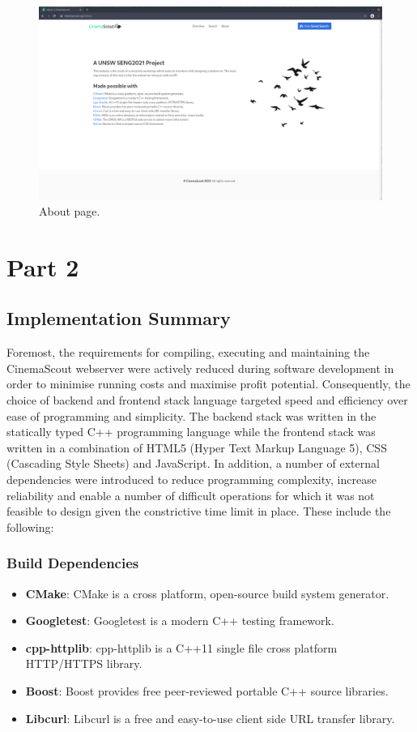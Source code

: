 \documentclass{article}
\begin{document}
\begin{figure}[H]
\includegraphics[width=\columnwidth]{res/about.png}
\caption{About page.}
\end{figure}
\newpage
\section{Part 2}
\subsection{Implementation Summary}
Foremost, the requirements for compiling, executing and maintaining the
CinemaScout webserver were actively reduced during software development in order
to minimise running costs and maximise profit potential. Consequently, the
choice of backend and frontend stack language targeted speed and efficiency over
ease of programming and simplicity. The backend stack was written in the 
statically typed C++ programming language while the frontend stack was written
in a combination of HTML5 (Hyper Text Markup Language 5), CSS (Cascading Style
Sheets) and JavaScript. In addition, a number of external dependencies were
introduced to reduce programming complexity, increase reliability and enable
a number of difficult operations for which it was not feasible to design given
the constrictive time limit in place. These include the following:
\subsubsection*{Build Dependencies}
\begin{itemize}
\item \textbf{CMake}: CMake is a cross platform, open-source build system
generator.
\item \textbf{Googletest}: Googletest is a modern C++ testing framework.
\item \textbf{cpp-httplib}: cpp-httplib is a C++11 single file cross platform
HTTP/HTTPS library.
\item \textbf{Boost}: Boost provides free peer-reviewed portable C++ source 
libraries.
\item \textbf{Libcurl}: Libcurl is a free and easy-to-use client side URL
transfer library.
\end{itemize}
\end{document}
